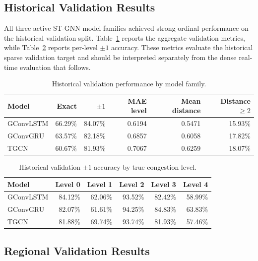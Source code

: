 
\subsection{Historical Validation Results}

All three active ST-GNN model families achieved strong ordinal performance on the historical validation split. Table~\ref{tab:global-validation-summary} reports the aggregate validation metrics, while Table~\ref{tab:global-validation-levels} reports per-level $\pm1$ accuracy. These metrics evaluate the historical sparse validation target and should be interpreted separately from the dense real-time evaluation that follows.

\begin{table}[htbp]
\centering
\caption{Historical validation performance by model family.}
\label{tab:global-validation-summary}
\begin{tabular}{lrrrrr}
\hline
Model & Exact & $\pm1$ & MAE level & Mean distance & Distance $\ge2$ \\
\hline
GConvLSTM & 66.29\% & 84.07\% & 0.6194 & 0.5471 & 15.93\% \\
GConvGRU & 63.57\% & 82.18\% & 0.6857 & 0.6058 & 17.82\% \\
TGCN & 60.67\% & 81.93\% & 0.7067 & 0.6259 & 18.07\% \\
\hline
\end{tabular}
\end{table}

\begin{table}[htbp]
\centering
\caption{Historical validation $\pm1$ accuracy by true congestion level.}
\label{tab:global-validation-levels}
\begin{tabular}{lrrrrr}
\hline
Model & Level 0 & Level 1 & Level 2 & Level 3 & Level 4 \\
\hline
GConvLSTM & 84.12\% & 62.06\% & 93.52\% & 82.42\% & 58.99\% \\
GConvGRU & 82.07\% & 61.61\% & 94.25\% & 84.83\% & 63.83\% \\
TGCN & 81.88\% & 69.74\% & 93.74\% & 81.93\% & 57.46\% \\
\hline
\end{tabular}
\end{table}

\subsection{Regional Validation Results}


